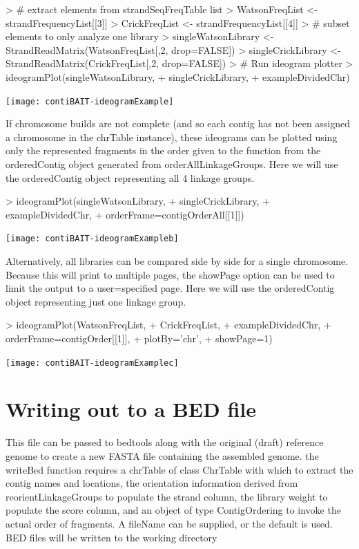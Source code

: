 \documentclass{article}
\begin{document}
\begin{Schunk}
\begin{Sinput}
> # extract elements from strandSeqFreqTable list
> WatsonFreqList <- strandFrequencyList[[3]]
> CrickFreqList <- strandFrequencyList[[4]]
> # subset elements to only analyze one library
> singleWatsonLibrary <- StrandReadMatrix(WatsonFreqList[,2, drop=FALSE])
> singleCrickLibrary <- StrandReadMatrix(CrickFreqList[,2, drop=FALSE]) 
> # Run ideogram plotter
> ideogramPlot(singleWatsonLibrary,
+ singleCrickLibrary,
+ exampleDividedChr)
\end{Sinput}
\end{Schunk}
\texttt{[image: contiBAIT-ideogramExample]}

If chromosome builds are not complete (and so each contig has not been assigned a chromosome in the chrTable instance), these ideograms can be plotted using only the represented fragments in the order given to the function from the orderedContig object generated from orderAllLinkageGroups.  Here we will use the orderedContig object representing all 4 linkage groups.

\begin{Schunk}
\begin{Sinput}
> ideogramPlot(singleWatsonLibrary,
+ singleCrickLibrary,
+ exampleDividedChr,
+ orderFrame=contigOrderAll[[1]])
\end{Sinput}
\end{Schunk}
\texttt{[image: contiBAIT-ideogramExampleb]}

Alternatively, all libraries can be compared side by side for a single chromosome. Because this will print to multiple pages, the showPage option can be used to limit the output to a user=specified page. Here we will use the orderedContig object representing just one linkage group.

\begin{Schunk}
\begin{Sinput}
> ideogramPlot(WatsonFreqList,
+ CrickFreqList,
+ exampleDividedChr,
+ orderFrame=contigOrder[[1]],
+ plotBy='chr',
+ showPage=1)
\end{Sinput}
\end{Schunk}
\texttt{[image: contiBAIT-ideogramExamplec]}


\section{Writing out to a BED file}
This file can be passed to bedtools along with the original (draft) reference genome to create a new FASTA file containing the assembled genome. the writeBed function requires a chrTable of class ChrTable with which to extract the contig names and locations, the orientation information derived from reorientLinkageGroups to populate the strand column, the library weight to populate the score column, and an object of type ContigOrdering to invoke the actual order of fragments.  A fileName can be supplied, or the default is used. BED files will be written to the working directory
\end{document}
